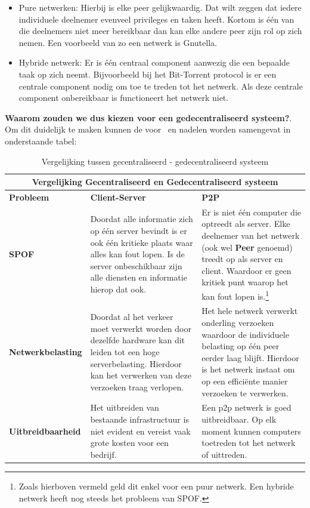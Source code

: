 \begin{itemize}
\item Pure netwerken: Hierbij is elke peer gelijkwaardig. Dat wilt zeggen dat iedere individuele deelnemer evenveel privileges en taken heeft. Kortom is één van die deelnemers niet meer bereikbaar dan kan elke andere peer zijn rol op zich nemen. Een voorbeeld van zo een netwerk is Gnutella.\\
\item Hybride netwerk: Er is één centraal component aanwezig die een bepaalde taak op zich neemt. Bijvoorbeeld bij het Bit-Torrent protocol is er een centrale component nodig om toe te treden tot het netwerk. Als deze centrale component onbereikbaar is functioneert het netwerk niet.\\
\end{itemize}


\textbf{Waarom zouden we dus kiezen voor een gedecentraliseerd systeem?}. Om dit duidelijk te maken kunnen de voor~ en nadelen worden samengevat in onderstaande tabel:\\

\begin{table}[h!]
	\centering
	\begin{tabular}{ |p{3cm}|p{6cm}|p{6cm}|}
		\hline
		\multicolumn{3}{|c|}{Vergelijking Gecentraliseerd en Gedecentraliseerd systeem}\\
		\hline
		\textbf{Probleem}&\textbf{Client-Server}&\textbf{P2P}\\
		\hline
		\textbf{SPOF}&Doordat alle informatie zich op één server bevindt is er ook één kritieke plaats waar alles kan fout lopen. Is de server onbeschikbaar zijn alle diensten en informatie hierop dat ook.& Er is niet één computer die optreedt als server. Elke deelnemer van het netwerk (ook wel \textbf{Peer} genoemd) treedt op als server en client. Waardoor er geen kritiek punt waarop het kan fout lopen is.\footnote{Zoals hierboven vermeld geld dit enkel voor een puur netwerk. Een hybride netwerk heeft nog steeds het probleem van SPOF.}\\
		\hline
		\textbf{Netwerkbelasting}&Doordat al het verkeer moet verwerkt worden door dezelfde hardware kan dit leiden tot een hoge serverbelasting. Hierdoor kan het verwerken van deze verzoeken traag verlopen.&Het hele netwerk verwerkt onderling verzoeken waardoor de individuele belasting op één peer eerder laag blijft. Hierdoor is het netwerk instaat om op een efficiënte manier verzoeken te verwerken.\\
		\hline
		\textbf{Uitbreidbaarheid}&Het uitbreiden van bestaande infrastructuur is niet evident en vereist vaak grote kosten voor een bedrijf.&Een p2p netwerk is goed uitbreidbaar. Op elk moment kunnen computers toetreden tot het netwerk of uittreden.\\
		\hline
	\end{tabular}
	\label{tbl_concepts}
	\caption{Vergelijking tussen gecentraliseerd - gedecentraliseerd systeem}
\end{table}
\newpage

